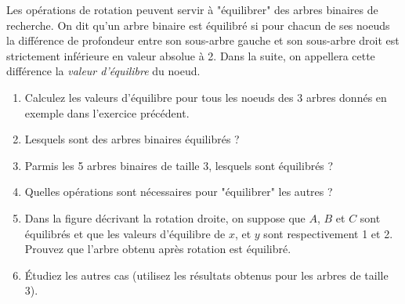 \documentclass{../cours}
\begin{document}
\begin{exercice}[\'Equilibrage]

Les opérations de rotation peuvent servir à "équilibrer" des arbres binaires de recherche. On dit qu'un arbre binaire est équilibré si pour chacun de ses noeuds la différence de profondeur entre son sous-arbre gauche et son sous-arbre droit est strictement inférieure en valeur absolue à 2. Dans la suite, on appellera cette différence la \emph{valeur d'équilibre} du noeud.

\begin{enumerate}
\item Calculez les valeurs d'équilibre pour tous les noeuds des 3 arbres donnés en exemple dans l'exercice précédent.

\item Lesquels sont des arbres binaires équilibrés ?

\item Parmis les 5 arbres binaires de taille 3, lesquels sont équilibrés ? 

\item Quelles opérations sont nécessaires pour "équilibrer" les autres ?

\item Dans la figure décrivant la rotation droite, on suppose que $A$, $B$ et $C$ sont équilibrés et que les valeurs d'équilibre de $x$, et $y$ sont respectivement 1 et 2. Prouvez que l'arbre obtenu après rotation est équilibré.

\item \'Etudiez les autres cas (utilisez les résultats obtenus pour les arbres de taille 3).
\end{enumerate}
\end{exercice}
\end{document}

